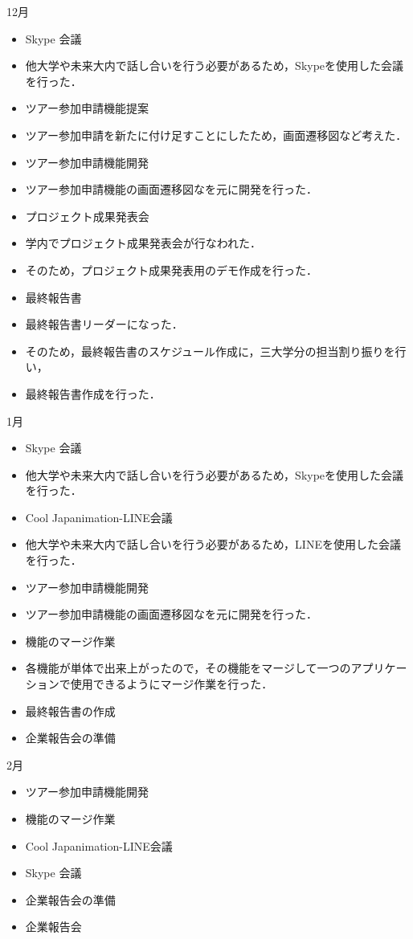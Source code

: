 12月
\begin{itemize}
\item Skype 会議
\item   他大学や未来大内で話し合いを行う必要があるため，Skypeを使用した会議を行った．
\item  ツアー参加申請機能提案
\item    ツアー参加申請を新たに付け足すことにしたため，画面遷移図など考えた．　
\item ツアー参加申請機能開発
\item    ツアー参加申請機能の画面遷移図なを元に開発を行った．
\item  プロジェクト成果発表会
\item 学内でプロジェクト成果発表会が行なわれた．
\item そのため，プロジェクト成果発表用のデモ作成を行った．
\item 最終報告書
\item   最終報告書リーダーになった．
\item   そのため，最終報告書のスケジュール作成に，三大学分の担当割り振りを行い，
\item   最終報告書作成を行った．
\end{itemize}

1月
\begin{itemize}
\item Skype 会議
\item   他大学や未来大内で話し合いを行う必要があるため，Skypeを使用した会議を行った．
\item Cool Japanimation-LINE会議
\item   他大学や未来大内で話し合いを行う必要があるため，LINEを使用した会議を行った．
\item ツアー参加申請機能開発
\item   ツアー参加申請機能の画面遷移図なを元に開発を行った．	
\item 機能のマージ作業
\item   各機能が単体で出来上がったので，その機能をマージして一つのアプリケーションで使用できるようにマージ作業を行った．
\item 最終報告書の作成
\item 企業報告会の準備
\end{itemize}

2月
\begin{itemize}
\item ツアー参加申請機能開発
\item 機能のマージ作業
\item Cool Japanimation-LINE会議
\item Skype 会議
\item 企業報告会の準備
\item 企業報告会
\end{itemize}

